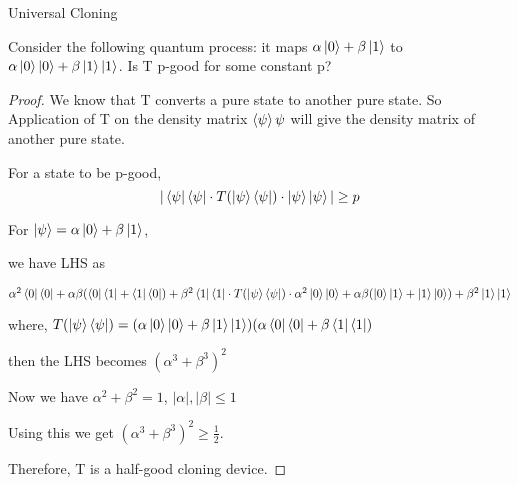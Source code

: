 \begin{solution}{Universal Cloning}\label{ques:x}
    \begin{question}
    Consider the following quantum process: it maps $\alpha \ket{0}+\beta\ket{1}$ to $\alpha \ket{0}\ket{0}+\beta\ket{1}\ket{1}$. Is T p-good for some constant p?
    \end{question}
    \tcblower{}
    \begin{proof}
    We know that T converts a pure state to another pure state. So Application of T on the density matrix $\braket{\psi}{\psi}$ will give the density matrix of another pure state.

    For a state to be p-good,
    \[|\bra{\psi}\bra{\psi}\cdot T(\ket{\psi}\bra{\psi})\cdot\ket{\psi}\ket{\psi}|\geq p\]

    For $\ket{\psi} = \alpha \ket{0}+\beta\ket{1}$,

    we have LHS as 

    $\alpha^2\bra{0}\bra{0}+\alpha\beta(\bra{0}\bra{1}+\bra{1}\bra{0})+\beta^2 \bra{1}\bra{1}\cdot T(\ket{\psi}\bra{\psi}) \cdot \alpha^2\ket{0}\ket{0}+\alpha\beta(\ket{0}\ket{1}+\ket{1}\ket{0})+\beta^2 \ket{1}\ket{1}$

    where,
    $T(\ket{\psi}\bra{\psi}) = (\alpha \ket{0}\ket{0}+\beta\ket{1}\ket{1})(\alpha \bra{0}\bra{0}+\beta\bra{1}\bra{1})$\newline

    then the LHS becomes $(\alpha^3+\beta^3)^2$

    Now we have $\alpha^2+\beta^2 =1$, $|\alpha|,|\beta| \leq 1$

    Using this we get $(\alpha^3+\beta^3)^2 \geq \frac{1}{2}$.

    Therefore, T is a half-good cloning device.
    \end{proof}
\end{solution}
 
